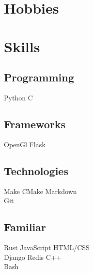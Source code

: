 \documentclass[]{resume-openfont}
\begin{document}
\begin{minipage}[t]{0.33\textwidth}
\section{Hobbies}
\sectionsep

\vspace{-2mm} %

\section{Skills}
\subsection{Programming}
Python \textbullet{} C
\sectionsep
\subsection{Frameworks}
OpenGl \textbullet{} Flask
\sectionsep
\subsection{Technologies}
Make  \textbullet{} CMake \textbullet{} Markdown \\
Git
\sectionsep
\subsection{Familiar}
Rust \textbullet{} JavaScript\textbullet{} HTML/CSS \\
Django \textbullet{} Redis \textbullet{} C++ \\
Bash
\sectionsep

%
%

\end{minipage}
\hfill
\end{document}

